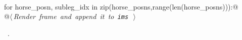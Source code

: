 \documentclass[11.5pt]{report}
\begin{document}
\begin{flushleft}
\begin{minipage}{\linewidth}
\begin{list}{}{}
\mbox{}\verb@@\\
\mbox{}\verb@     for horse_posn, subleg_idx in zip(horse_posns,range(len(horse_posns))):@\\
\mbox{}\verb@          @\hbox{$\langle\,${\itshape Render frame and append it to \verb|ims|}\nobreak\ {\footnotesize {}}$\,\rangle$}\verb@@\\
\mbox{}\verb@@{\NWsep}
\end{list}
\vspace{-1.5ex}
\footnotesize
\begin{list}{}{\setlength{\itemsep}{-\parsep}\setlength{\itemindent}{-\leftmargin}}
\item \NWtxtMacroRefIn\ .

\item{}
\end{list}
\end{minipage}\vspace{4ex}
\end{flushleft}
\end{document}
